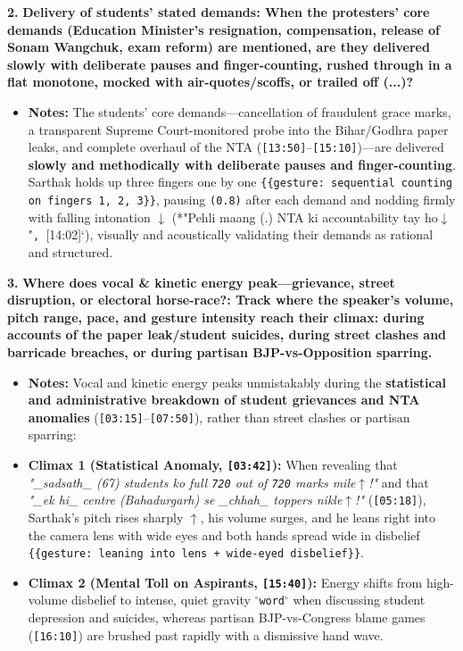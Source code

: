 \documentclass[10pt,a4paper]{article}
\begin{document}
\noindent\textbf{2.} \textbf{Delivery of students' stated demands: When the protesters' core demands (Education Minister's resignation, compensation, release of Sonam Wangchuk, exam reform) are mentioned, are they delivered slowly with deliberate pauses and finger-counting, rushed through in a flat monotone, mocked with air-quotes/scoffs, or trailed off (...)?}\par\smallskip
\begin{itemize}
  \item \textbf{Notes:}
The students' core demands---cancellation of fraudulent grace marks, a transparent Supreme Court-monitored probe into the Bihar/Godhra paper leaks, and complete overhaul of the NTA (\texttt{[13:50]}--\texttt{[15:10]})---are delivered \textbf{slowly and methodically with deliberate pauses and finger-counting}. Sarthak holds up three fingers one by one \texttt{\{\{gesture: sequential counting on fingers 1, 2, 3\}\}}, pausing \texttt{(0.8)} after each demand and nodding firmly with falling intonation \texttt{$\downarrow$} (*"Pehli maang (.) NTA ki accountability tay ho$\downarrow$"\texttt{, }[14:02]`), visually and acoustically validating their demands as rational and structured.\par\smallskip
\end{itemize}

\noindent\textbf{3.} \textbf{Where does vocal \& kinetic energy peak---grievance, street disruption, or electoral horse-race?: Track where the speaker's volume, pitch range, pace, and gesture intensity reach their climax: during accounts of the paper leak/student suicides, during street clashes and barricade breaches, or during partisan BJP-vs-Opposition sparring.}\par\smallskip
\begin{itemize}
  \item \textbf{Notes:}
Vocal and kinetic energy peaks unmistakably during the \textbf{statistical and administrative breakdown of student grievances and NTA anomalies} (\texttt{[03:15]}--\texttt{[07:50]}), rather than street clashes or partisan sparring:\par\smallskip
  \item \textbf{Climax 1 (Statistical Anomaly, \texttt{[03:42]}):} When revealing that \textit{"\_sadsath\_ (67) students ko full \texttt{720} out of \texttt{720} marks mile$\uparrow$!"} and that \textit{"\_ek hi\_ centre (Bahadurgarh) se \_chhah\_ toppers nikle$\uparrow$!"} (\texttt{[05:18]}), Sarthak's pitch rises sharply \texttt{$\uparrow$}, his volume surges, and he leans right into the camera lens with wide eyes and both hands spread wide in disbelief \texttt{\{\{gesture: leaning into lens + wide-eyed disbelief\}\}}.
  \item \textbf{Climax 2 (Mental Toll on Aspirants, \texttt{[15:40]}):} Energy shifts from high-volume disbelief to intense, quiet gravity \texttt{$^\circ$word$^\circ$} when discussing student depression and suicides, whereas partisan BJP-vs-Congress blame games (\texttt{[16:10]}) are brushed past rapidly with a dismissive hand wave.
\end{itemize}
\end{document}
